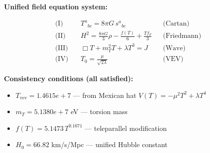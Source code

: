 
\textbf{Unified field equation system:}

\begin{align}
  \text{(I)} \quad & T^a{}_{bc} = 8\pi G \, s^a{}_{bc} && \text{(Cartan)} \\
  \text{(II)} \quad & H^2 = \frac{8\pi G}{3}\rho - \frac{f(T)}{6} + \frac{Tf_T}{3} && \text{(Friedmann)} \\
  \text{(III)} \quad & \Box T + m_T^2 T + \lambda T^3 = J && \text{(Wave)} \\
  \text{(IV)} \quad & T_0 = \frac{\mu}{\sqrt{2\lambda}} && \text{(VEV)}
\end{align}

\textbf{Consistency conditions (all satisfied):}
\begin{itemize}
  \item $T_{\text{vev}} = 1.4615e+7$ — from Mexican hat $V(T) = -\mu^2 T^2 + \lambda T^4$
  \item $m_T = 5.1380e+7$ eV — torsion mass
  \item $f(T) = 5.1473 \, T^{0.1671}$ — teleparallel modification
  \item $H_0 = 66.82$ km/s/Mpc — unified Hubble constant
\end{itemize}